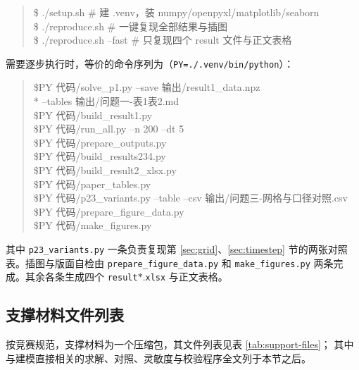\documentclass[12pt,a4paper,fontset=none]{ctexart}
\begin{document}
\begin{quote}\small
\ttfamily\raggedright
\$ ./setup.sh \hfill \# 建 .venv，装 numpy/openpyxl/matplotlib/seaborn\\[2pt]
\$ ./reproduce.sh \hfill \# 一键复现全部结果与插图\\[2pt]
\$ ./reproduce.sh --fast \hfill \# 只复现四个 result 文件与正文表格
\end{quote}

需要逐步执行时，等价的命令序列为（\texttt{PY=./.venv/bin/python}）：

\begin{quote}\small
\ttfamily\raggedright
\$PY 代码/solve\_p1.py --save 输出/result1\_data.npz\\*
\hspace*{1.6em}--tables 输出/问题一-表1表2.md\\[2pt]
\$PY 代码/build\_result1.py\\[2pt]
\$PY 代码/run\_all.py --n 200 --dt 5\\[2pt]
\$PY 代码/prepare\_outputs.py\\[2pt]
\$PY 代码/build\_results234.py\\[2pt]
\$PY 代码/build\_result2\_xlsx.py\\[2pt]
\$PY 代码/paper\_tables.py\\[2pt]
\$PY 代码/p23\_variants.py --table --csv 输出/问题三-网格与口径对照.csv\\[2pt]
\$PY 代码/prepare\_figure\_data.py\\[2pt]
\$PY 代码/make\_figures.py
\end{quote}

其中 \texttt{p23\_variants.py} 一条负责复现第 \ref{sec:grid}、\ref{sec:timestep}
节的两张对照表。插图与版面自检由 \texttt{prepare\_figure\_data.py} 和
\texttt{make\_figures.py} 两条完成。其余各条生成四个
\texttt{result}$\ast$.\texttt{xlsx} 与正文表格。

\subsection*{支撑材料文件列表}

按竞赛规范，支撑材料为一个压缩包，其文件列表见表 \ref{tab:support-files}；
其中与建模直接相关的求解、对照、灵敏度与校验程序全文列于本节之后。
\end{document}
